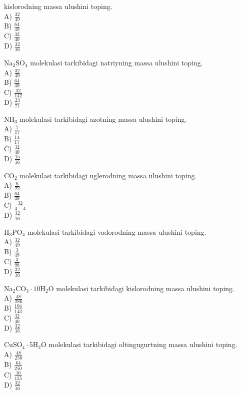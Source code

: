 kislorodning massa ulushini toping.\\
A) $\frac{32}{49}$\\
B) $\frac{64}{49}$\\
C) $\frac{32}{40}$\\
D) $\frac{32}{16}$
  \item $\mathrm{Na}_{2} \mathrm{SO}_{4}$ molekulasi tarkibidagi natriyning massa ulushini toping.\\
A) $\frac{32}{49}$\\
B) $\frac{64}{49}$\\
C) $\frac{32}{142}$\\
D) $\frac{23}{71}$
  \item $\mathrm{NH}_{3}$ molekulasi tarkibidagi azotning massa ulushini toping.\\
A) $\frac{7}{17}$\\
B) $\frac{14}{17}$\\
C) $\frac{32}{40}$\\
D) $\frac{15}{16}$
  \item $\mathrm{CO}_{2}$ molekulasi tarkibidagi uglerodning massa ulushini toping.\\
A) $\frac{6}{22}$\\
B) $\frac{64}{49}$\\
C) $\frac{32}{4-4}$\\
D) $\frac{32}{16}$
  \item $\mathrm{H}_{3} \mathrm{PO}_{4}$ molekulasi tarkibidagi vadorodning massa ulushini toping.\\
A) $\frac{32}{49}$\\
B) $\frac{3}{49}$\\
C) $\frac{3}{98}$\\
D) $\frac{32}{16}$
  \item $\mathrm{Na}_{2} \mathrm{CO}_{3} \cdot 10 \mathrm{H}_{2} \mathrm{O}$ molekulasi tarkibidagi kislorodning massa ulushini toping.\\
A) $\frac{48}{286}$\\
B) $\frac{104}{143}$\\
C) $\frac{32}{40}$\\
D) $\frac{32}{16}$
  \item $\mathrm{CuSO}_{4} \cdot 5 \mathrm{H}_{2} \mathrm{O}$ molekulasi tarkibidagi oltingugurtning massa ulushini toping.\\
A) $\frac{48}{250}$\\
B) $\frac{64}{250}$\\
C) $\frac{16}{125}$\\
D) $\frac{32}{16}$
